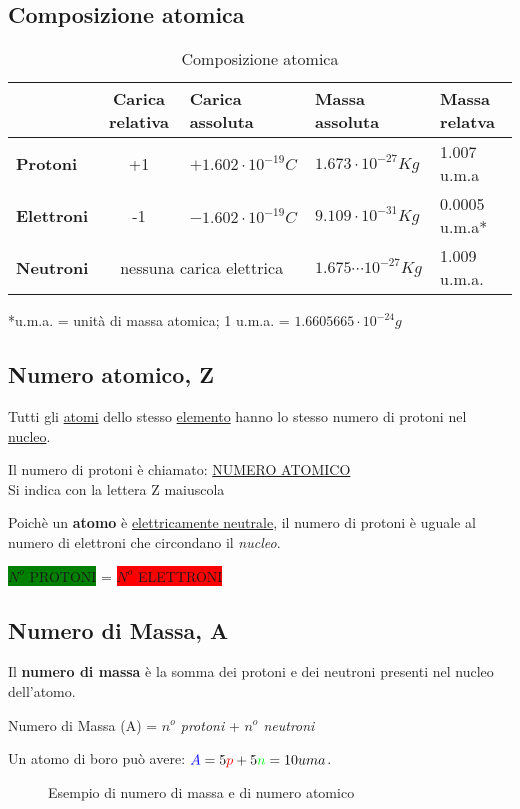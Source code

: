 \subsection{Composizione atomica}
\label{sec:compatom}
\begin{table}[!ht]
  \centering
  \begin{tabular}{lclll}
    &Carica relativa&Carica assoluta&Massa assoluta & Massa relatva\\\hline
    \textbf{Protoni} & +1 & $+1.602\cdot 10^{-19}C$ & $1.673\cdot 10^{-27}Kg$ & 1.007 u.m.a\\\hline
    \textbf{Elettroni} & -1  & $-1.602\cdot 10^{-19}C$ & $9.109\cdot 10^{-31}Kg$ & 0.0005 u.m.a*\\\hline
    \textbf{Neutroni} & \multicolumn{2}{c}{\color{red}nessuna carica elettrica} & $1.675\cdots10^{-27} Kg$
                                    & 1.009 u.m.a.\\
    \hline
  \end{tabular}
  \caption{Composizione atomica}
  \label{tab:compatom}
\end{table}
*u.m.a. = unità di massa atomica; 1 u.m.a. = $1.6605665\cdot 10^{-24}g$

\subsection{Numero atomico, Z}
\label{sec:numatom}

Tutti gli \underline{\color{red} atomi} dello stesso \underline{\color{blue}elemento} hanno lo stesso numero di
{\color{green} protoni} nel \underline{nucleo}.
\begin{center}
  Il numero di protoni è chiamato: \underline{\color{green}NUMERO ATOMICO}\\
  Si indica con la lettera {\color{green}Z} maiuscola
\end{center}
Poichè un \textbf{atomo} è \underline{elettricamente neutrale}, il numero di {\color{green}protoni} è uguale
al numero di {\color{red}elettroni} che circondano il \textit{nucleo}.
\begin{center}
  \colorbox{green}{$N^o$ PROTONI} = \colorbox{red}{$N^o$ ELETTRONI}
\end{center}

\subsection{Numero di Massa, A}
\label{sec:num.massa,a}

Il \textbf{numero di massa} è la somma dei protoni e dei neutroni presenti nel nucleo dell'atomo.
\begin{center}
  {\color{blue}Numero di Massa (A)} = \textit{\color{red}$n^o$ protoni} + \textit{\color{green}$n^o$ neutroni} 
\end{center}
Un atomo di boro può avere: ${\color{blue}A} = 5{\color{red}p} +5{\color{green}n}=10uma$.
\begin{figure}[ht!]
  \centering
  \resizebox{3.5in}{!}{} 
  \caption{Esempio di numero di massa e di numero atomico}
  \label{fig:es}
\end{figure}

